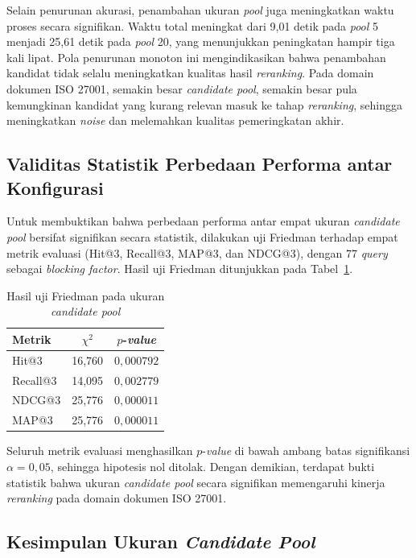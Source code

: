 Selain penurunan akurasi, penambahan ukuran \textit{pool} juga meningkatkan waktu proses secara signifikan. Waktu total meningkat dari 9{,}01 detik pada \textit{pool} 5 menjadi 25{,}61 detik pada \textit{pool} 20, yang menunjukkan peningkatan hampir tiga kali lipat. Pola penurunan monoton ini mengindikasikan bahwa penambahan kandidat tidak selalu meningkatkan kualitas hasil \textit{reranking}. Pada domain dokumen ISO 27001, semakin besar \textit{candidate pool}, semakin besar pula kemungkinan kandidat yang kurang relevan masuk ke tahap \textit{reranking}, sehingga meningkatkan \textit{noise} dan melemahkan kualitas pemeringkatan akhir.

\subsection{Validitas Statistik Perbedaan Performa antar Konfigurasi}

Untuk membuktikan bahwa perbedaan performa antar empat ukuran \textit{candidate pool} bersifat signifikan secara statistik, dilakukan uji Friedman terhadap empat metrik evaluasi (Hit@3, Recall@3, MAP@3, dan NDCG@3), dengan 77 \textit{query} sebagai \textit{blocking factor}. Hasil uji Friedman ditunjukkan pada Tabel~\ref{tbl:422_friedman_pool}.

\begin{table}[H]
	\centering
	\caption{Hasil uji Friedman pada ukuran \textit{candidate pool}}
	\label{tbl:422_friedman_pool}
	\small
	\begin{tabular}{lcc}
		\toprule
		Metrik & $\chi^2$ & $p$-\textit{value} \\
		\midrule
		Hit@3    & 16{,}760 & $0{,}000792$ \\
		Recall@3      & 14{,}095 & $0{,}002779$ \\
		NDCG@3        & 25{,}776 & $0{,}000011$ \\
		MAP@3         & 25{,}776 & $0{,}000011$ \\
		\bottomrule
	\end{tabular}
\end{table}

Seluruh metrik evaluasi menghasilkan $p$-\textit{value} di bawah ambang batas signifikansi $\alpha = 0{,}05$, sehingga hipotesis nol ditolak. Dengan demikian, terdapat bukti statistik bahwa ukuran \textit{candidate pool} secara signifikan memengaruhi kinerja \textit{reranking} pada domain dokumen ISO 27001.

\subsection{Kesimpulan Ukuran \textit{Candidate Pool}}

